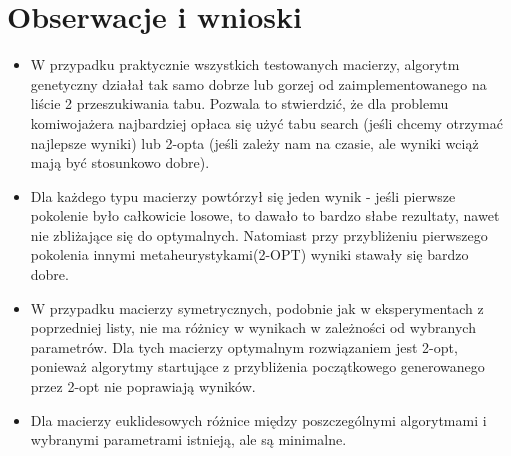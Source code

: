 \documentclass{article}
\begin{document}
\section{Obserwacje i wnioski}
\begin{itemize}
\item W przypadku praktycznie wszystkich testowanych macierzy, algorytm genetyczny działał tak samo dobrze lub gorzej od zaimplementowanego na liście 2 przeszukiwania tabu. Pozwala to stwierdzić, że dla problemu komiwojażera najbardziej opłaca się użyć tabu search (jeśli chcemy otrzymać najlepsze wyniki) lub 2-opta (jeśli zależy nam na czasie, ale wyniki wciąż mają być stosunkowo dobre).

\item Dla każdego typu macierzy powtórzył się jeden wynik - jeśli pierwsze pokolenie było całkowicie losowe, to dawało to bardzo słabe rezultaty, nawet nie zbliżające się do optymalnych. Natomiast przy przybliżeniu pierwszego pokolenia innymi metaheurystykami(2-OPT) wyniki stawały się bardzo dobre.

\item W przypadku macierzy symetrycznych, podobnie jak w eksperymentach z poprzedniej listy, nie ma różnicy w wynikach w zależności od wybranych parametrów. Dla tych macierzy optymalnym rozwiązaniem jest 2-opt, ponieważ algorytmy startujące z przybliżenia początkowego generowanego przez 2-opt nie poprawiają wyników.

\item Dla macierzy euklidesowych różnice między poszczególnymi algorytmami i wybranymi parametrami istnieją, ale są minimalne.


\end{itemize}
\end{document}
